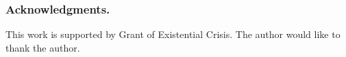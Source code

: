 \subsubsection{Acknowledgments.}
This work is supported by {\color{red}Grant of Existential Crisis}.
The author would like to thank the author.
